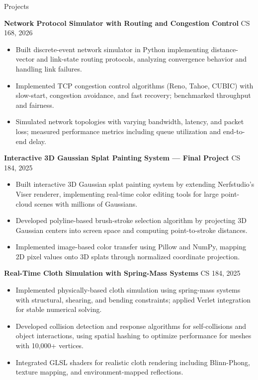 \documentclass{resume}
\begin{document}
\begin{rSection}{Projects}

\textbf{Network Protocol Simulator with Routing and Congestion Control} \hfill CS 168, 2026
\begin{itemize}
  \item Built discrete-event network simulator in Python implementing distance-vector and link-state routing protocols, analyzing convergence behavior and handling link failures.
  \item Implemented TCP congestion control algorithms (Reno, Tahoe, CUBIC) with slow-start, congestion avoidance, and fast recovery; benchmarked throughput and fairness.
  \item Simulated network topologies with varying bandwidth, latency, and packet loss; measured performance metrics including queue utilization and end-to-end delay.
\end{itemize}

\textbf{Interactive 3D Gaussian Splat Painting System — Final Project} \hfill CS 184, 2025
\begin{itemize}
  \item Built interactive 3D Gaussian splat painting system by extending Nerfstudio's Viser renderer, implementing real-time color editing tools for large point-cloud scenes with millions of Gaussians.
  \item Developed polyline-based brush-stroke selection algorithm by projecting 3D Gaussian centers into screen space and computing point-to-stroke distances.
  \item Implemented image-based color transfer using Pillow and NumPy, mapping 2D pixel values onto 3D splats through normalized coordinate projection.
\end{itemize}

\textbf{Real-Time Cloth Simulation with Spring-Mass Systems} \hfill CS 184, 2025
\begin{itemize}
  \item Implemented physically-based cloth simulation using spring-mass systems with structural, shearing, and bending constraints; applied Verlet integration for stable numerical solving.
  \item Developed collision detection and response algorithms for self-collisions and object interactions, using spatial hashing to optimize performance for meshes with 10,000+ vertices.
  \item Integrated GLSL shaders for realistic cloth rendering including Blinn-Phong, texture mapping, and environment-mapped reflections.
\end{itemize}

\end{rSection}
\end{document}
